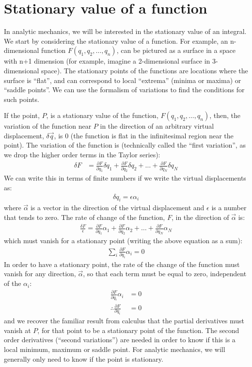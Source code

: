 \section{Stationary value of a function}
In analytic mechanics, we will be interested in the stationary value of an integral. We start by considering the stationary value of a function. For example, an n-dimensional function $F(q_1, q_2, \dots, q_n)$, can be pictured as a surface in a space with n+1 dimension (for example, imagine a 2-dimensional surface in 3-dimensional space). The stationary points of the functions are locations where the surface is ``flat'', and can correspond to local ``extrema'' (minima or maxima) or ``saddle points''. We can use the formalism of variations to find the conditions for such points. 

If the point, $P$, is a stationary value of the function, $F(q_1, q_2, \dots, q_n)$, then, the variation of the function near $P$ in the direction of an arbitrary virtual displacement, $\delta\vec{q}$, is 0 (the function is flat in the infinitesimal region near the point). The variation of the function is (technically called the ``first variation'', as we drop the higher order terms in the Taylor series):
\begin{align}
\delta F&=\frac{\partial F}{\partial q_1}\delta q_1 + \frac{\partial F}{\partial q_2}\delta q_2 +\dots+\frac{\partial F}{\partial q_N}\delta q_N
\end{align}  
We can write this in terms of finite numbers if we write the virtual displacements as:
\begin{align}
\delta q_i=\epsilon \alpha_i
\end{align}
where $\vec{\alpha}$ is a vector in the direction of the virtual displacement and $\epsilon$ is a number that tends to zero. The rate of change of the function, $F$, in the direction of $\vec{\alpha}$ is:
\begin{align}
\frac{\delta F}{\epsilon}=\frac{\partial F}{\partial q_1}\alpha_1 + \frac{\partial F}{\partial q_2}\alpha_2 +\dots+\frac{\partial F}{\partial q_N}\alpha_N
\end{align} 
which must vanish for a stationary point (writing the above equation as a sum):
\begin{align}
\sum_i\frac{\partial F}{\partial q_i}\alpha_i =0
\end{align} 
In order to have a stationary point, the rate of the change of the function must vanish for any direction, $\vec{\alpha}$, so that each term must be equal to zero, independent of the $\alpha_i$:
\begin{align}
\frac{\partial F}{\partial q_i}\alpha_i &=0\nonumber\\
\therefore \frac{\partial F}{\partial q_i}&=0
\end{align}
and we recover the familiar result from calculus that the partial derivatives must vanish at $P$, for that point to be a stationary point of the function. The second order derivatives (``second variations'') are needed in order to know if this is a local minimum, maximum or saddle point. For analytic mechanics, we will generally only need to know if the point is stationary.

